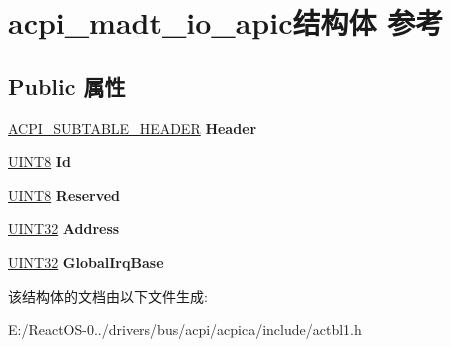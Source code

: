 \hypertarget{structacpi__madt__io__apic}{}\section{acpi\+\_\+madt\+\_\+io\+\_\+apic结构体 参考}
\label{structacpi__madt__io__apic}
\subsection*{Public 属性}
\begin{DoxyCompactItemize}
\item 
\mbox{\label{structacpi__madt__io__apic_a9976d8fb1e09be8718c30eed4c4d0aaf}} 
\hyperlink{structacpi__subtable__header}{A\+C\+P\+I\+\_\+\+S\+U\+B\+T\+A\+B\+L\+E\+\_\+\+H\+E\+A\+D\+ER} {\bfseries Header}
\item 
\mbox{\label{structacpi__madt__io__apic_ac97b9c12c385eea9df9f59c27f794f32}} 
\hyperlink{_processor_bind_8h_ab27e9918b538ce9d8ca692479b375b6a}{U\+I\+N\+T8} {\bfseries Id}
\item 
\mbox{\label{structacpi__madt__io__apic_a308677859241a984f6c50f58573bca77}} 
\hyperlink{_processor_bind_8h_ab27e9918b538ce9d8ca692479b375b6a}{U\+I\+N\+T8} {\bfseries Reserved}
\item 
\mbox{\label{structacpi__madt__io__apic_a38addd44381165f3517754670c2dedde}} 
\hyperlink{_processor_bind_8h_ae1e6edbbc26d6fbc71a90190d0266018}{U\+I\+N\+T32} {\bfseries Address}
\item 
\mbox{\label{structacpi__madt__io__apic_acf9e01aa3e09d9d251841d5be7deb9ec}} 
\hyperlink{_processor_bind_8h_ae1e6edbbc26d6fbc71a90190d0266018}{U\+I\+N\+T32} {\bfseries Global\+Irq\+Base}
\end{DoxyCompactItemize}


该结构体的文档由以下文件生成\+:\begin{DoxyCompactItemize}
\item 
E\+:/\+React\+O\+S-\/0../drivers/bus/acpi/acpica/include/actbl1.\+h\end{DoxyCompactItemize}
